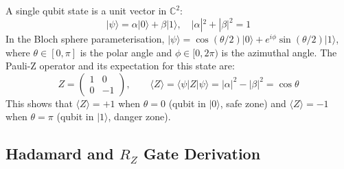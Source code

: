 A single qubit state is a unit vector in $\mathbb{C}^2$:
\begin{equation}
    |\psi\rangle = \alpha|0\rangle + \beta|1\rangle, \quad |\alpha|^2 + |\beta|^2 = 1
    \label{eq:qubit}
\end{equation}
In the Bloch sphere parameterisation, $|\psi\rangle = \cos(\theta/2)|0\rangle + e^{i\phi}\sin(\theta/2)|1\rangle$, where $\theta \in [0,\pi]$ is the polar angle and $\phi \in [0, 2\pi)$ is the azimuthal angle. The Pauli-Z operator and its expectation for this state are:
\begin{equation}
    Z = \begin{pmatrix} 1 & 0 \\ 0 & -1 \end{pmatrix}, \qquad
    \langle Z \rangle = \langle\psi|Z|\psi\rangle = |\alpha|^2 - |\beta|^2 = \cos\theta
    \label{eq:pauli_z_exp}
\end{equation}
This shows that $\langle Z \rangle = +1$ when $\theta = 0$ (qubit in $|0\rangle$, safe zone) and $\langle Z \rangle = -1$ when $\theta = \pi$ (qubit in $|1\rangle$, danger zone).

\subsection{Hadamard and $R_Z$ Gate Derivation}

